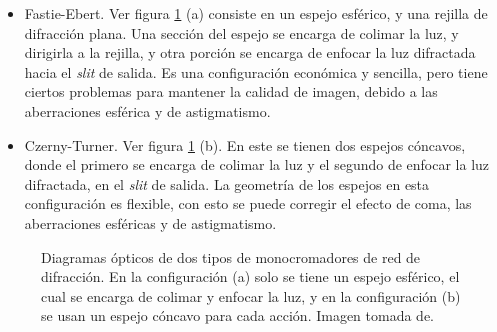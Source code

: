 \begin{itemize}
	\item Fastie-Ebert. Ver figura \ref{fig:Configuraciones} (a) consiste en un espejo esférico, y una rejilla de difracción plana. Una sección del espejo se encarga de colimar la luz, y dirigirla a la rejilla, y otra porción se encarga de enfocar la luz difractada hacia el \textit{slit} de salida.
	Es una configuración económica y sencilla, pero tiene ciertos problemas para mantener la calidad de imagen, debido a las aberraciones esférica y de astigmatismo.
	\item  Czerny-Turner. Ver figura \ref{fig:Configuraciones} (b). En este se tienen dos espejos cóncavos, donde el primero se encarga de colimar la luz y el segundo de enfocar la luz difractada, en el \textit{slit} de salida. La geometría de los espejos en esta configuración es flexible, con esto se puede corregir el efecto de coma, las aberraciones esféricas y de astigmatismo. 
\end{itemize} 
\begin{figure}[h!]
	\centering
	\label{fig:Configuraciones}
	\caption[Diagramas ópticos de dos tipos de monocromadores de red de difracción.]{Diagramas ópticos de dos tipos de monocromadores de red de difracción. En la configuración (a) solo se tiene un espejo esférico, el cual se encarga de colimar y enfocar la luz, y en la configuración (b) se usan un espejo cóncavo para cada acción. Imagen tomada de. \cite{Gratings2008}} 
	
\end{figure}


